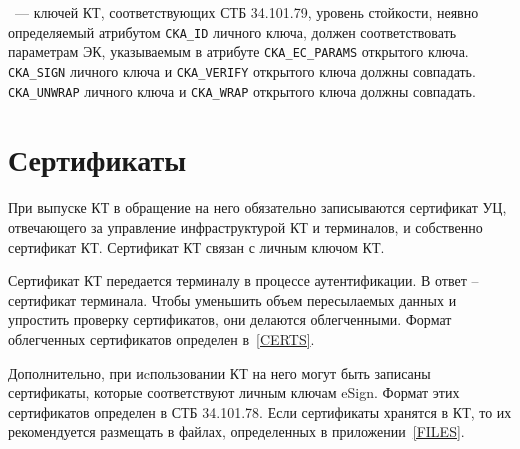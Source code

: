 \begin{note}
~---
 ключей КТ, соответствующих СТБ 34.101.79,
уровень стойкости, неявно определяемый атрибутом \verb|CKA_ID| личного ключа,
должен соответствовать параметрам ЭК, указываемым в атрибуте 
\verb|CKA_EC_PARAMS| открытого ключа.  
\verb|CKA_SIGN| личного ключа и \verb|CKA_VERIFY| открытого ключа должны 
совпадать.  \verb|CKA_UNWRAP| личного ключа и 
\verb|CKA_WRAP| открытого ключа должны совпадать. 
\end{note}


\fi 

\section{Сертификаты}\label{OBJ.Certs}

При выпуске КТ в обращение на него обязательно записываются сертификат 
УЦ, отвечающего за управление инфраструктурой КТ и терминалов,
и собственно сертификат КТ. Сертификат КТ связан с личным ключом КТ. 

Сертификат КТ передается терминалу в процессе аутентификации. 
В ответ -- сертификат терминала. Чтобы уменьшить объем пересылаемых 
данных и упростить проверку сертификатов, они делаются облегченными.
Формат облегченных сертификатов определен в~\ref{CERTS}.


Дополнительно, при иcпользовании КТ на него могут быть записаны
сертификаты, которые соответствуют личным ключам eSign.
Формат этих сертификатов определен в СТБ 34.101.78.
Если сертификаты хранятся в КТ, то их рекомендуется размещать в файлах, 
определенных в приложении~\ref{FILES}.

